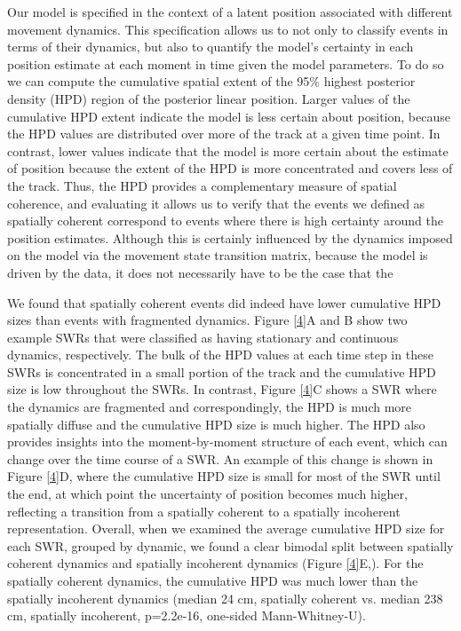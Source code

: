 \documentclass[times, twoside]{zHenriquesLab-StyleBioRxiv}
\begin{document}
Our model is specified in the context of a latent position associated with different movement dynamics. This specification allows us to not only to classify events in terms of their dynamics, but also to quantify the model's certainty in each position estimate at each moment in time given the model parameters. To do so we can compute the cumulative spatial extent of the 95\% highest posterior density (HPD) region of the posterior linear position. Larger values of the cumulative HPD extent indicate the model is less certain about position, because the HPD values are distributed over more of the track at a given time point. In contrast, lower values indicate that the model is more certain about the estimate of position because the extent of the HPD is more concentrated and covers less of the track. Thus, the HPD provides a complementary measure of spatial coherence, and evaluating it allows us to verify that the events we defined as spatially coherent correspond to events where there is high certainty around the position estimates. Although this is certainly influenced by the dynamics imposed on the model via the movement state transition matrix, because the model is driven by the data, it does not necessarily have to be the case that the 

We found that spatially coherent events did indeed have lower cumulative HPD sizes than events with fragmented dynamics. Figure \ref{4}A and B show two example SWRs that were classified as having stationary and continuous dynamics, respectively. The bulk of the HPD values at each time step in these SWRs is concentrated in a small portion of the track and the cumulative HPD size is low throughout the SWRs. In contrast, Figure \ref{4}C shows a SWR where the dynamics are fragmented and correspondingly, the HPD is much more spatially diffuse and the cumulative HPD size is much higher. The HPD also provides insights into the moment-by-moment structure of each event, which can change over the time course of a SWR. An example of this change is shown in Figure \ref{4}D, where the cumulative HPD size is small for most of the SWR until the end, at which point the uncertainty of position becomes much higher, reflecting a transition from a spatially coherent to a spatially incoherent representation. Overall, when we examined the average cumulative HPD size for each SWR, grouped by dynamic, we found a clear bimodal split between spatially coherent dynamics and spatially incoherent dynamics (Figure \ref{4}E,). For the spatially coherent dynamics, the cumulative HPD was much lower than the spatially incoherent dynamics (median 24 cm, spatially coherent vs. median 238 cm, spatially incoherent, p=2.2e-16, one-sided Mann-Whitney-U).
\end{document}

